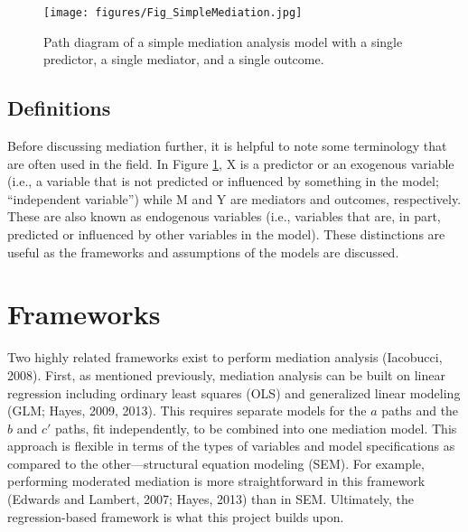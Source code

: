 \documentclass[]{DissertateUSU}
\begin{document}
\begin{figure}
  \centering
  \texttt{[image: figures/Fig\_SimpleMediation.jpg]}
  \caption{Path diagram of a simple mediation analysis model with a single predictor, a single mediator, and a single outcome.}
  \label{fig:simplemed}
\end{figure}

\subsection{Definitions}\label{definitions}

Before discussing mediation further, it is helpful to note some
terminology that are often used in the field. In Figure
\ref{fig:simplemed}, X is a predictor or an exogenous variable (i.e., a
variable that is not predicted or influenced by something in the model;
``independent variable'') while M and Y are mediators and outcomes,
respectively. These are also known as endogenous variables (i.e.,
variables that are, in part, predicted or influenced by other variables
in the model). These distinctions are useful as the frameworks and
assumptions of the models are discussed.

\section{Frameworks}\label{frameworks}

Two highly related frameworks exist to perform mediation analysis
(Iacobucci, 2008). First, as mentioned previously, mediation analysis
can be built on linear regression including ordinary least squares (OLS)
and generalized linear modeling (GLM; Hayes, 2009, 2013). This requires
separate models for the \(a\) paths and the \(b\) and \(c'\) paths, fit
independently, to be combined into one mediation model. This approach is
flexible in terms of the types of variables and model specifications as
compared to the other---structural equation modeling (SEM). For example,
performing moderated mediation is more straightforward in this framework
(Edwards and Lambert, 2007; Hayes, 2013) than in SEM. Ultimately, the
regression-based framework is what this project builds upon.
\end{document}
